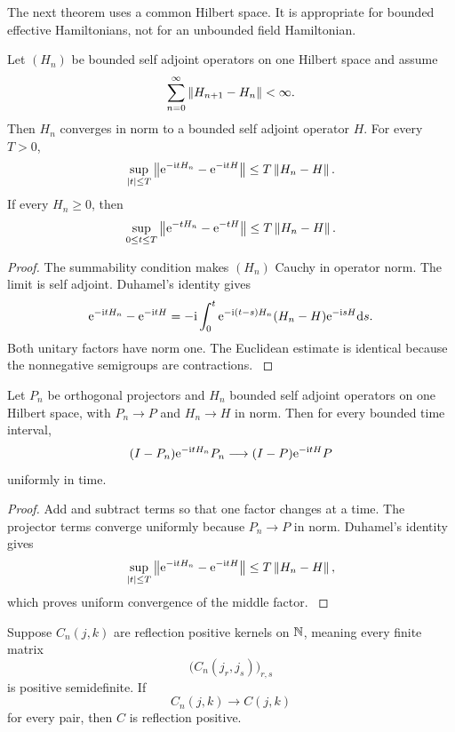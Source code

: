 The next theorem uses a common Hilbert space. It is appropriate for bounded effective Hamiltonians, not for an unbounded field Hamiltonian.

\begin{theorem}\label{strong:theorem:047}\label{strong:thm:norm_summable_tower}
Let \((H_n)\) be bounded self adjoint operators on one Hilbert space and assume
\[
\sum_{n=0}^{\infty}\left\lVert H_{n+1}-H_n\right\rVert<\infty.
\]
Then \(H_n\) converges in norm to a bounded self adjoint operator \(H\). For every \(T>0\),
\[
\sup_{\abs t\leq T}
\norm{\e^{-\ii tH_n}-\e^{-\ii tH}}
\leq
T\norm{H_n-H}.
\]
If every \(H_n\geq0\), then
\[
\sup_{0\leq t\leq T}
\norm{\e^{-tH_n}-\e^{-tH}}
\leq
T\norm{H_n-H}.
\]
\end{theorem}

\begin{proof}\label{strong:proof:075}
The summability condition makes \((H_n)\) Cauchy in operator norm. The limit is self adjoint. Duhamel's identity gives
\[
\e^{-\ii tH_n}-\e^{-\ii tH}
=-\ii\int_0^t
\e^{-\ii(t-s)H_n}(H_n-H)\e^{-\ii sH}\dd s.
\]
Both unitary factors have norm one. The Euclidean estimate is identical because the nonnegative semigroups are contractions.
\label{strong:proof:075:end}\end{proof}

\begin{corollary}\label{strong:corollary:016}\label{strong:cor:limit_leakage}
Let \(P_n\) be orthogonal projectors and \(H_n\) bounded self adjoint operators on one Hilbert space, with \(P_n\to P\) and \(H_n\to H\) in norm. Then for every bounded time interval,
\[
(I-P_n)\e^{-\ii tH_n}P_n
\longrightarrow
(I-P)\e^{-\ii tH}P
\]
uniformly in time.
\end{corollary}

\begin{proof}\label{strong:proof:076}
Add and subtract terms so that one factor changes at a time. The projector terms converge uniformly because \(P_n\to P\) in norm. Duhamel's identity gives
\[
\sup_{\abs t\leq T}
\norm{\e^{-\ii tH_n}-\e^{-\ii tH}}
\leq
T\norm{H_n-H},
\]
which proves uniform convergence of the middle factor.
\label{strong:proof:076:end}\end{proof}

\begin{theorem}\label{strong:theorem:048}\label{strong:thm:reflection_limit}
Suppose \(C_n(j,k)\) are reflection positive kernels on \(\NN\), meaning every finite matrix
\[
\bigl(C_n(j_r,j_s)\bigr)_{r,s}
\]
is positive semidefinite. If
\[
C_n(j,k)\longrightarrow C(j,k)
\]
for every pair, then \(C\) is reflection positive.
\end{theorem}


